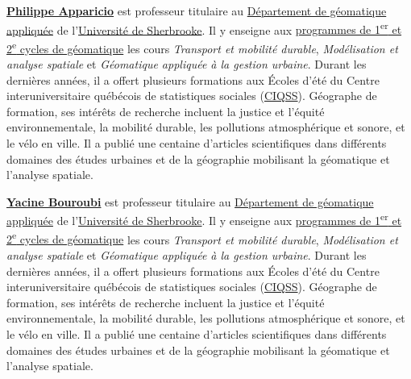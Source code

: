 \documentclass[
  letterpaper,
  DIV=11,
  numbers=noendperiod]{scrreprt}
\begin{document}
\href{https://www.usherbrooke.ca/recherche/fr/specialistes/details/philippe.apparicio}{\textbf{Philippe
Apparicio}} est professeur titulaire au
\href{https://www.usherbrooke.ca/geomatique/}{Département de géomatique
appliquée} de l'\href{https://www.usherbrooke.ca/}{Université de
Sherbrooke}. Il y enseigne aux
\href{https://www.usherbrooke.ca/geomatique/etudes/programmes}{programmes
de 1\textsuperscript{er} et 2\textsuperscript{e} cycles de géomatique}
les cours \emph{Transport et mobilité durable}, \emph{Modélisation et
analyse spatiale} et \emph{Géomatique appliquée à la gestion urbaine}.
Durant les dernières années, il a offert plusieurs formations aux Écoles
d'été du Centre interuniversitaire québécois de statistiques sociales
(\href{https://www.ciqss.org/}{CIQSS}). Géographe de formation, ses
intérêts de recherche incluent la justice et l'équité environnementale,
la mobilité durable, les pollutions atmosphérique et sonore, et le vélo
en ville. Il a publié une centaine d'articles scientifiques dans
différents domaines des études urbaines et de la géographie mobilisant
la géomatique et l'analyse spatiale.

\href{https://www.usherbrooke.ca/geomatique/departement/personnel/personnel-enseignant/yacine-bouroubi}{\textbf{Yacine
Bouroubi}} est professeur titulaire au
\href{https://www.usherbrooke.ca/geomatique/}{Département de géomatique
appliquée} de l'\href{https://www.usherbrooke.ca/}{Université de
Sherbrooke}. Il y enseigne aux
\href{https://www.usherbrooke.ca/geomatique/etudes/programmes}{programmes
de 1\textsuperscript{er} et 2\textsuperscript{e} cycles de géomatique}
les cours \emph{Transport et mobilité durable}, \emph{Modélisation et
analyse spatiale} et \emph{Géomatique appliquée à la gestion urbaine}.
Durant les dernières années, il a offert plusieurs formations aux Écoles
d'été du Centre interuniversitaire québécois de statistiques sociales
(\href{https://www.ciqss.org/}{CIQSS}). Géographe de formation, ses
intérêts de recherche incluent la justice et l'équité environnementale,
la mobilité durable, les pollutions atmosphérique et sonore, et le vélo
en ville. Il a publié une centaine d'articles scientifiques dans
différents domaines des études urbaines et de la géographie mobilisant
la géomatique et l'analyse spatiale.
\end{document}
